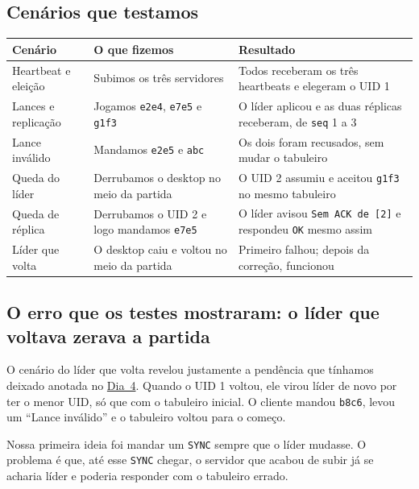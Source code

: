 \subsection*{Cenários que testamos}
\begin{center}
\begin{tabular}{|p{}|p{}|p{}|}
\hline
\raggedright \textbf{Cenário} & \raggedright \textbf{O que fizemos} & \raggedright \textbf{Resultado} \tabularnewline
\hline
\raggedright Heartbeat e eleição & \raggedright Subimos os três servidores & \raggedright Todos receberam os três heartbeats e elegeram o UID 1 \tabularnewline
\hline
\raggedright Lances e replicação & \raggedright Jogamos \texttt{e2e4}, \texttt{e7e5} e \texttt{g1f3} & \raggedright O líder aplicou e as duas réplicas receberam, de \texttt{seq} 1 a 3 \tabularnewline
\hline
\raggedright Lance inválido & \raggedright Mandamos \texttt{e2e5} e \texttt{abc} & \raggedright Os dois foram recusados, sem mudar o tabuleiro \tabularnewline
\hline
\raggedright Queda do líder & \raggedright Derrubamos o desktop no meio da partida & \raggedright O UID 2 assumiu e aceitou \texttt{g1f3} no mesmo tabuleiro \tabularnewline
\hline
\raggedright Queda de réplica & \raggedright Derrubamos o UID 2 e logo mandamos \texttt{e7e5} & \raggedright O líder avisou \texttt{Sem ACK de [2]} e respondeu \texttt{OK} mesmo assim \tabularnewline
\hline
\raggedright Líder que volta & \raggedright O desktop caiu e voltou no meio da partida & \raggedright Primeiro falhou; depois da correção, funcionou \tabularnewline
\hline
\end{tabular}
\end{center}

\subsection*{O erro que os testes mostraram: o líder que voltava zerava a partida}
O cenário do líder que volta revelou justamente a pendência que tínhamos deixado anotada no \hyperref[dia:4]{Dia~4}. Quando o UID 1 voltou, ele virou líder de novo por ter o menor UID, só que com o tabuleiro inicial. O cliente mandou \texttt{b8c6}, levou um ``Lance inválido'' e o tabuleiro voltou para o começo.

Nossa primeira ideia foi mandar um \texttt{SYNC} sempre que o líder mudasse. O problema é que, até esse \texttt{SYNC} chegar, o servidor que acabou de subir já se acharia líder e poderia responder com o tabuleiro errado.

